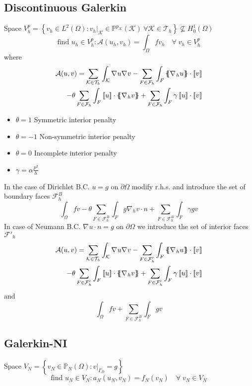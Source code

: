 \documentclass[a4paper,11pt]{article}
\theoremstyle{break}
\renewcommand*{\grad}{\nabla\mspace{1mu}}
\newcommand*{\txt}[1]{\text{#1}}
\newcommand*{\limited}[1]{\vert_{#1}}
\newcommand{\jump}[1]{\left[\!\left[#1\right]\!\right]}
\newcommand{\average}[1]{\left\{\mspace{-6.5mu}\left\{#1\right\}\mspace{-6.5mu}\right\}}
\newcommand{\element}{\mathcal{K}}
\newcommand{\triangulation}{\mathcal{T}_h}
\newcommand{\boundary}{{\partial\Omega}}
\newcommand{\eit}{{\element\in\triangulation}}
\newcommand{\find}{\txt{find }}
\numberwithin{equation}{section}
\begin{document}
\subsection*{Discontinuous Galerkin}
Space \(V^p_h = \left\{ v_h \in L^2(\Omega) : v_h\limited{\element} \in \mathbb{P}^{p_\element}(\element) \ \forall \eit \right\}\not \subseteq H^1_0(\Omega)\)
\[
    \find u_h \in V^p_h : \mathcal{A}(u_h, v_h) = \int_\Omega fv_h \quad \forall \; v_h \in V_h^p
\]
where 
\[
    \begin{split}
        \mathcal{A}(u,v) = \sum_\eit \int_\element \grad u \grad v - \sum_{F \in \mathcal{F}_h} \int_F \average{\grad_h u} \cdot \jump{v} \\
        -\theta \sum_{F \in \mathcal{F}_h} \int_F \jump{u} \cdot \average{\grad_h v} + \sum_{F \in \mathcal{F}_h} \int_F \gamma \jump{u} \cdot \jump{v}
    \end{split}
\]
\begin{itemize}
    \item \(\theta = 1\) Symmetric interior penalty
    \item \(\theta = -1\) Non-symmetric interior penalty
    \item \(\theta = 0\) Incomplete interior penalty
    \item \(\gamma = \alpha \frac{p^2}{h}\)
\end{itemize}
In the case of Dirichlet B.C. \(u = g\) on \(\boundary\) modify r.h.s. and introduce the set of boundary faces \(\mathcal{F}^B_h\)
\[
    \int_\Omega fv - \theta \sum_{F \in \mathcal{F}^B_h} \int_F g \grad_h v \cdot n + \sum_{F \in \mathcal{F}^B_h} \int_F \gamma g v 
\]
In case of Neumann B.C. \(\grad u \cdot n = g\) on \(\boundary\) we introduce the set of interior faces \(\mathcal{F}'_h\)
\[
    \begin{split}
        \mathcal{A}(u,v) = \sum_\eit \int_\element \grad u \grad v - \sum_{F \in \mathcal{F}'_h} \int_F \average{\grad_h u} \cdot \jump{v} \\
        -\theta \sum_{F \in \mathcal{F}'_h} \int_F \jump{u} \cdot \average{\grad_h v} + \sum_{F \in \mathcal{F}'_h} \int_F \gamma \jump{u} \cdot \jump{v}
    \end{split}
\]
and 
\[
    \int_\Omega fv + \sum_{F \in \mathcal{F}^B_h} \int_F g v 
\]
\subsection{Galerkin-NI}
Space \(V_N = \left\{ v_N \in \mathbb{P}_N(\Omega) : v\limited{\Gamma_D} = g \right\}\)
\[
    \find u_N \in V_N : a_N(u_N,v_N) = f_N(v_N) \quad \forall \; v_N \in V_N
\]
\end{document}
